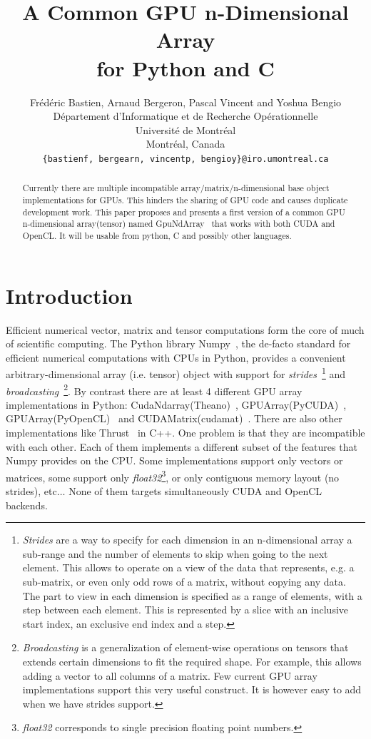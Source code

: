 \documentclass{article} %
\title{A Common GPU n-Dimensional Array \\
 for Python and C}
\author{
Frédéric Bastien, Arnaud Bergeron, Pascal Vincent and Yoshua Bengio \\
D\'epartement d'Informatique et de Recherche Op\'erationnelle\\
Universit\'e de Montr\'eal\\
Montr\'eal, Canada \\
\texttt{\{bastienf, bergearn, vincentp, bengioy\}@iro.umontreal.ca} \\
}
\begin{document}
\maketitle

\begin{abstract}
Currently there are multiple incompatible array/matrix/n-dimensional base object implementations for GPUs. 
This hinders the sharing of GPU code and causes duplicate development work.
This paper proposes and presents a first version of a common GPU n-dimensional array(tensor) named GpuNdArray~\citep{GpuNdArray} that works with both CUDA and OpenCL.
It will be usable from python, C and possibly other languages.
\end{abstract}

\section{Introduction}
Efficient numerical vector, matrix and tensor computations form the core of much of scientific computing.
The Python library Numpy~\citep{numpy-2007}, the de-facto standard for efficient numerical computations with CPUs in Python, provides a convenient 
arbitrary-dimensional array (i.e. tensor) object with support for \emph{strides}~\footnote{
\emph{Strides} are a way to specify for each dimension in an n-dimensional array a sub-range and the number of elements to skip when going
to the next element. 
This allows to operate on a view of the data that represents, e.g. a sub-matrix, or even only odd rows of a matrix, without copying any data.
The part to view in each dimension is specified as a range of elements, with a step between each element.
This is represented by a slice with an inclusive start index, an exclusive end index and a step.
}
and \emph{broadcasting}~\footnote{
\emph{Broadcasting} is a generalization of element-wise operations on tensors that extends certain dimensions to fit the required shape.
For example, this allows adding a vector to all columns of a matrix.
Few current GPU array implementations support this very useful construct.
It is however easy to add when we have strides support.
}.
By contrast there are at least 4 different GPU array implementations in
Python: CudaNdarray(Theano)~\citep{bergstra+al:2010-scipy},
GPUArray(PyCUDA)~\citep{kloeckner_pycuda_2009},
GPUArray(PyOpenCL)~\citep{kloeckner_pycuda_2009} and
CUDAMatrix(cudamat)~\citep{cudamat-TR2009}. 
There are also other implementations like Thrust~\citep{Thrust} in C++.
One problem is that they are incompatible with each other.
Each of them implements a different subset of the features that Numpy provides on the CPU.
Some implementations support only vectors or matrices, some support only \emph{float32}\footnote{
\emph{float32} corresponds to single precision floating point numbers.
}, or only contiguous memory layout (no strides), etc$\ldots$
None of them targets simultaneously CUDA and OpenCL backends.
\end{document}
